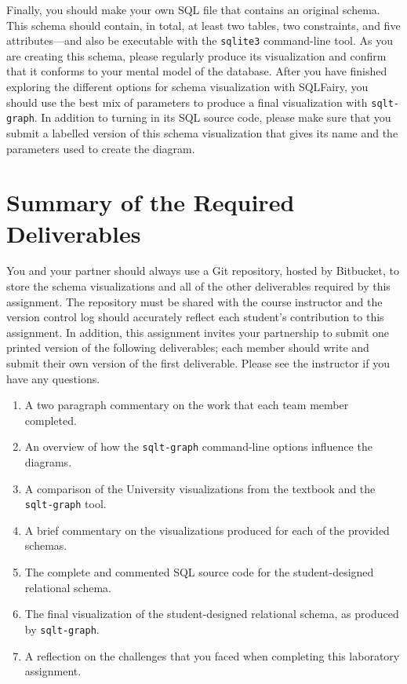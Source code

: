Finally, you should make your own SQL file that contains an original schema.  This schema should contain, in total, at
least two tables, two constraints, and five attributes---and also be executable with the {\tt sqlite3} command-line
tool. As you are creating this schema, please regularly produce its visualization and confirm that it conforms to your
mental model of the database.  After you have finished exploring the different options for schema visualization with
SQLFairy, you should use the best mix of parameters to produce a final visualization with {\tt sqlt-graph}.  In addition
to turning in its SQL source code, please make sure that you submit a labelled version of this schema visualization that
gives its name and the parameters used to create the diagram. 

\section*{Summary of the Required Deliverables}

You and your partner should always use a Git repository, hosted by Bitbucket, to store the schema visualizations and
all of the other deliverables required by this assignment. The repository must be shared with the course instructor and
the version control log should accurately reflect each student's contribution to this assignment. In addition, this
assignment invites your partnership to submit one printed version of the following deliverables; each member should
write and submit their own version of the first deliverable. Please see the instructor if you have any questions.


\begin{enumerate}
  \setlength{\itemsep}{0pt}
  \item A two paragraph commentary on the work that each team member completed. 
  \item An overview of how the {\tt sqlt-graph} command-line options influence the diagrams.
  \item A comparison of the University visualizations from the textbook and the {\tt sqlt-graph} tool.
  \item A brief commentary on the visualizations produced for each of the provided schemas.
  \item The complete and commented SQL source code for the student-designed relational schema.
  \item The final visualization of the student-designed relational schema, as produced by {\tt sqlt-graph}.
  \item A reflection on the challenges that you faced when completing this laboratory assignment.
\end{enumerate}

